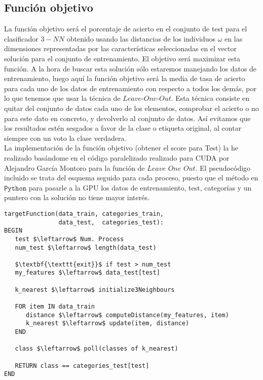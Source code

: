 \documentclass[11pt,leqno]{article}
\begin{document}
\subsection{Función objetivo}
	La función objetivo será el porcentaje de acierto en el conjunto de test para el clasificador $3-NN$ obtenido usando las distancias de los individuos $\omega$ en las dimensiones representadas por las características seleccionadas en el vector solución para el conjunto de entrenamiento. El objetivo será maximizar esta función. A la hora de buscar esta solución sólo estaremos manejando los datos de entrenamiento, luego aquí la función objetivo será la media de tasa de acierto para cada uno de los datos de entrenamiento con respecto a todos los demás, por lo que tenemos que usar la técnica de $\textit{Leave-One-Out}$. Esta técnica consiste en quitar del conjunto de datos cada uno de los elementos, comprobar el acierto o no para este dato en concreto, y devolverlo al conjunto de datos. Así evitamos que los resultados estén sesgados a favor de la clase o etiqueta original, al contar siempre con un voto la clase verdadera.\\
	La implementación de la función objetivo (obtener el score para Test) la he realizado basándome en el código paralelizado realizado para CUDA por Alejandro García Montoro para la función de $\textit{Leave One Out}$. El pseudocódigo incluido se trata del esquema seguido para cada proceso, puesto que el método en $\texttt{Python}$ para pasarle a la GPU los datos de entrenamiento, test, categorías y un puntero con la solución no tiene mayor interés.
	
\begin{lstlisting}[mathescape=true]
targetFunction(data_train, categories_train, 
               data_test,  categories_test):
BEGIN
   test $\leftarrow$ Num. Process
   num_test $\leftarrow$ length(data_test)
   
   $\textbf{\texttt{exit}}$ if test > num_test
   my_features $\leftarrow$ data_test[test]
   
   k_nearest $\leftarrow$ initialize3Neighbours
	
   FOR item IN data_train
      distance $\leftarrow$ computeDistance(my_features, item)
      k_nearest $\leftarrow$ update(item, distance)
   END
	
   class $\leftarrow$ poll(classes of k_nearest)
      
   RETURN class == categories_test[test]
END
\end{lstlisting}
\end{document}
